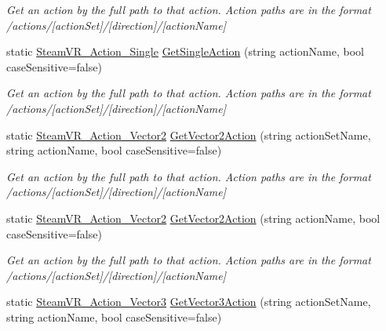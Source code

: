 \begin{DoxyCompactItemize}
\begin{DoxyCompactList}\small\item\em Get an action by the full path to that action. Action paths are in the format /actions/\mbox{[}action\+Set\mbox{]}/\mbox{[}direction\mbox{]}/\mbox{[}action\+Name\mbox{]} \end{DoxyCompactList}\item 
static \mbox{\hyperlink{class_valve_1_1_v_r_1_1_steam_v_r___action___single}{Steam\+V\+R\+\_\+\+Action\+\_\+\+Single}} \mbox{\hyperlink{class_valve_1_1_v_r_1_1_steam_v_r___input_afe873662970a8590722180d656847fb2}{Get\+Single\+Action}} (string action\+Name, bool case\+Sensitive=false)
\begin{DoxyCompactList}\small\item\em Get an action by the full path to that action. Action paths are in the format /actions/\mbox{[}action\+Set\mbox{]}/\mbox{[}direction\mbox{]}/\mbox{[}action\+Name\mbox{]} \end{DoxyCompactList}\item 
static \mbox{\hyperlink{class_valve_1_1_v_r_1_1_steam_v_r___action___vector2}{Steam\+V\+R\+\_\+\+Action\+\_\+\+Vector2}} \mbox{\hyperlink{class_valve_1_1_v_r_1_1_steam_v_r___input_a10c56b6e9e99bca06abc8a9337b89e82}{Get\+Vector2\+Action}} (string action\+Set\+Name, string action\+Name, bool case\+Sensitive=false)
\begin{DoxyCompactList}\small\item\em Get an action by the full path to that action. Action paths are in the format /actions/\mbox{[}action\+Set\mbox{]}/\mbox{[}direction\mbox{]}/\mbox{[}action\+Name\mbox{]} \end{DoxyCompactList}\item 
static \mbox{\hyperlink{class_valve_1_1_v_r_1_1_steam_v_r___action___vector2}{Steam\+V\+R\+\_\+\+Action\+\_\+\+Vector2}} \mbox{\hyperlink{class_valve_1_1_v_r_1_1_steam_v_r___input_abb8ad8e823781ceec0aac7ebc7db1125}{Get\+Vector2\+Action}} (string action\+Name, bool case\+Sensitive=false)
\begin{DoxyCompactList}\small\item\em Get an action by the full path to that action. Action paths are in the format /actions/\mbox{[}action\+Set\mbox{]}/\mbox{[}direction\mbox{]}/\mbox{[}action\+Name\mbox{]} \end{DoxyCompactList}\item 
static \mbox{\hyperlink{class_valve_1_1_v_r_1_1_steam_v_r___action___vector3}{Steam\+V\+R\+\_\+\+Action\+\_\+\+Vector3}} \mbox{\hyperlink{class_valve_1_1_v_r_1_1_steam_v_r___input_ad1b586b8d732a3d58754705dc828cccf}{Get\+Vector3\+Action}} (string action\+Set\+Name, string action\+Name, bool case\+Sensitive=false)

\end{DoxyCompactItemize}
